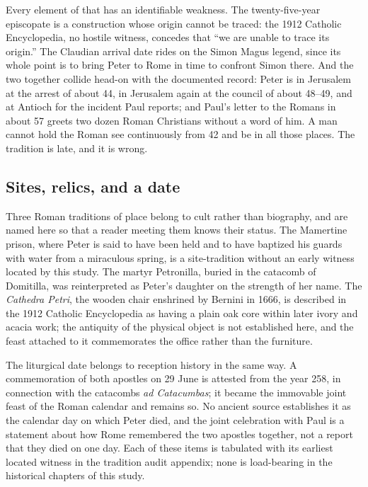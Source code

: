 Every element of that has an identifiable weakness. The twenty-five-year
episcopate is a construction whose origin cannot be traced: the 1912 Catholic
Encyclopedia, no hostile witness, concedes that ``we are unable to trace its
origin.'' The Claudian arrival date rides on the Simon Magus legend, since
its whole point is to bring Peter to Rome in time to confront Simon there.
And the two together collide head-on with the documented record: Peter is in
Jerusalem at the arrest of about 44, in Jerusalem again at the council of
about 48--49, and at Antioch for the incident Paul reports; and Paul's letter
to the Romans in about 57 greets two dozen Roman Christians without a word of
him. A man cannot hold the Roman see continuously from 42 and be in all those
places. The tradition is late, and it is wrong.

\subsection{Sites, relics, and a date}

Three Roman traditions of place belong to cult rather than biography, and are
named here so that a reader meeting them knows their status. The Mamertine
prison, where Peter is said to have been held and to have baptized his
guards with water from a miraculous spring, is a site-tradition without an
early witness located by this study. The martyr Petronilla, buried in the
catacomb of Domitilla, was reinterpreted as Peter's daughter on the strength
of her name. The \textit{Cathedra Petri}, the wooden chair enshrined by
Bernini in 1666, is described in the 1912 Catholic Encyclopedia as having a
plain oak core within later ivory and acacia work; the antiquity of the
physical object is not established here, and the feast attached to it
commemorates the office rather than the furniture.

The liturgical date belongs to reception history in the same way. A
commemoration of both apostles on 29 June is attested from the year 258, in
connection with the catacombs \textit{ad Catacumbas}; it became the immovable
joint feast of the Roman calendar and remains so. No ancient source
establishes it as the calendar day on which Peter died, and the joint
celebration with Paul is a statement about how Rome remembered the two
apostles together, not a report that they died on one day. Each of these
items is tabulated with its earliest located witness in the tradition audit
appendix; none is load-bearing in the historical chapters of this study.
